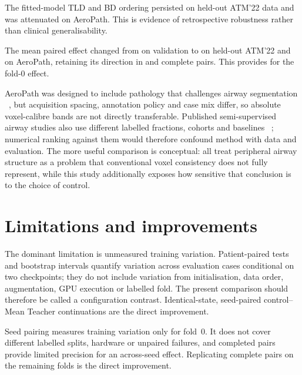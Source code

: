 \ifshowcurrentcontrol
\begin{currentcontrolroute}
The fitted-model TLD and BD ordering persisted on held-out ATM'22 data and was attenuated on
AeroPath. This is evidence of retrospective robustness rather than clinical generalisability.
\end{currentcontrolroute}
\fi

\ifshowpairedcontrol
\begin{pairedcontrolroute}
The mean paired effect changed from \pending on validation to \pending on held-out ATM'22 and
\pending on AeroPath, retaining its direction in \pending and \pending complete pairs. This
provides  for the fold-0 effect.
\end{pairedcontrolroute}
\fi

AeroPath was designed to include pathology that challenges airway segmentation
~\cite{stoverud2023aeropath}, but acquisition spacing, annotation policy and case mix differ, so
absolute voxel-calibre bands are not directly transferable. Published semi-supervised airway
studies also use different labelled fractions, cohorts and baselines
~\cite{gu2023featurespecialisation,zhu2024crossgeometry}; numerical ranking against them would
therefore confound method with data and evaluation. The more useful comparison is conceptual:
all treat peripheral airway structure as a problem that conventional voxel consistency does not
fully represent, while this study additionally exposes how sensitive that conclusion is to the
choice of control.

\section{Limitations and improvements}

\ifshowcurrentcontrol
\begin{currentcontrolroute}
The dominant limitation is unmeasured training variation. Patient-paired tests and bootstrap
intervals quantify variation across evaluation cases conditional on two checkpoints; they do not
include variation from initialisation, data order, augmentation, GPU execution or labelled fold.
The present comparison should therefore be called a configuration contrast. Identical-state,
seed-paired control--Mean Teacher continuations are the direct improvement.
\end{currentcontrolroute}
\fi

\ifshowpairedcontrol
\begin{pairedcontrolroute}
Seed pairing measures training variation only for fold~0. It does not cover different labelled
splits, hardware or unpaired failures, and \pending[: number] completed pairs provide limited
precision for an across-seed effect. Replicating complete pairs on the remaining folds is the
direct improvement.
\end{pairedcontrolroute}
\fi

